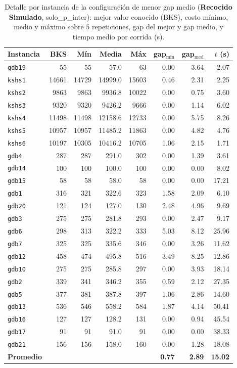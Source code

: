 \begin{table}[htbp]\centering
\caption{Detalle por instancia de la configuraci\'on de menor gap medio (\textbf{Recocido Simulado}, solo\_p\_inter): mejor valor conocido (BKS), costo m\'inimo, medio y m\'aximo sobre $5$ repeticiones, gap del mejor y gap medio, y tiempo medio por corrida (s).}
\label{tab:detalle-mejor}
\footnotesize
\begin{tabular}{l rrrr rr r}
\toprule
Instancia & BKS & M\'in & Media & M\'ax & gap$_{\min}$ & gap$_{\text{med}}$ & $t$ (s) \\
\midrule
\texttt{gdb19} & 55 & 55 & 57.0 & 63 & 0.00 & 3.64 & 2.07 \\
\texttt{kshs1} & 14661 & 14729 & 14999.0 & 15603 & 0.46 & 2.31 & 2.25 \\
\texttt{kshs2} & 9863 & 9863 & 9936.8 & 10022 & 0.00 & 0.75 & 3.60 \\
\texttt{kshs3} & 9320 & 9320 & 9426.2 & 9666 & 0.00 & 1.14 & 6.02 \\
\texttt{kshs4} & 11498 & 11498 & 12158.6 & 12733 & 0.00 & 5.75 & 8.26 \\
\texttt{kshs5} & 10957 & 10957 & 11485.2 & 11863 & 0.00 & 4.82 & 4.76 \\
\texttt{kshs6} & 10197 & 10305 & 10416.2 & 10705 & 1.06 & 2.15 & 1.71 \\
\texttt{gdb4} & 287 & 287 & 291.0 & 302 & 0.00 & 1.39 & 3.61 \\
\texttt{gdb14} & 100 & 100 & 100.0 & 100 & 0.00 & 0.00 & 8.02 \\
\texttt{gdb15} & 58 & 58 & 58.0 & 58 & 0.00 & 0.00 & 17.21 \\
\texttt{gdb1} & 316 & 321 & 322.6 & 323 & 1.58 & 2.09 & 6.10 \\
\texttt{gdb20} & 121 & 124 & 127.0 & 130 & 2.48 & 4.96 & 9.69 \\
\texttt{gdb3} & 275 & 275 & 281.8 & 293 & 0.00 & 2.47 & 9.17 \\
\texttt{gdb6} & 298 & 313 & 322.2 & 333 & 5.03 & 8.12 & 25.96 \\
\texttt{gdb7} & 325 & 325 & 335.6 & 346 & 0.00 & 3.26 & 11.62 \\
\texttt{gdb12} & 458 & 474 & 495.8 & 516 & 3.49 & 8.25 & 12.86 \\
\texttt{gdb10} & 275 & 275 & 285.8 & 297 & 0.00 & 3.93 & 18.14 \\
\texttt{gdb2} & 339 & 341 & 346.2 & 355 & 0.59 & 2.12 & 27.35 \\
\texttt{gdb5} & 377 & 381 & 387.8 & 397 & 1.06 & 2.86 & 14.60 \\
\texttt{gdb13} & 536 & 546 & 558.2 & 584 & 1.87 & 4.14 & 50.41 \\
\texttt{gdb16} & 127 & 127 & 128.2 & 131 & 0.00 & 0.94 & 45.54 \\
\texttt{gdb17} & 91 & 91 & 91.0 & 91 & 0.00 & 0.00 & 38.33 \\
\texttt{gdb21} & 156 & 156 & 158.0 & 160 & 0.00 & 1.28 & 18.08 \\
\midrule
\textbf{Promedio} & & & & & \textbf{0.77} & \textbf{2.89} & \textbf{15.02} \\
\bottomrule
\end{tabular}
\end{table}

